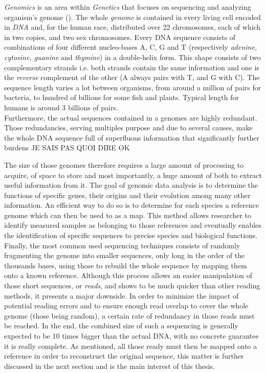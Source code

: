 \textit{Genomics} is an area within \textit{Genetics} that focuses on sequencing and analyzing organism's genome (\cite{genomic}). The whole \textit{genome} is contained in every living cell  encoded in \textit{DNA} and, for the human race, distributed over 22 chromosomes, each of which in two copies, and two sex chromosomes. Every DNA sequence consists of combinations of four different nucleo-bases A, C, G and T (respectively \textit{adenine, cytosine, guanine} and \textit{thymine}) in a double-helix form. This shape consists of two complementary strands i.e. both strands contain the same information and one is the \textit{reverse} complement of the other (A always pairs with T, and G with C). The sequence length varies a lot between organisms, from around a million of pairs for bacteria, to hundred of billions for some fish and plants. Typical length for humans is around 3 billions of pairs. \\

Furthermore, the actual sequences contained in a genomes are highly redundant. Those redundancies, serving multiples purpose and due to several causes, make the whole DNA sequence full of superfluous information that significantly further burdens
JE SAIS PAS QUOI DIRE OK

The size of those genomes therefore requires a large amount of processing to acquire, of space to store and most importantly, a huge amount of both to extract useful information from it. The goal of genomic data analysis is to determine the functions of specific genes, their origins and their evolution among many other information. An efficient way to do so is to determine for each species a reference genome which can then be used to as a map. This method allows researcher to identify measured samples as belonging to those references and eventually enables the identification of specific sequences to precise species and biological functions. \\

Finally, the most common used sequencing techniques consists of randomly fragmenting the genome into smaller sequences, only long in the order of the thousands bases, using those to rebuild the whole sequence by mapping them onto a known reference. Although this process allows an easier manipulation of those short sequences, or \textit{reads}, and shows to be much quicker than other reading methods, it presents a major downside. In order to minimize the impact of potential reading errors and to ensure enough read overlap to cover the whole genome (those being random), a certain rate of redundancy in those reads must be reached. In the end, the combined size of such a sequencing is generally expected to be 10 times bigger than the actual DNA, with no concrete guarantee it is really complete. As mentioned, all those ready must then be mapped onto a reference in order to reconstruct the original sequence, this matter is further discussed in the next section and is the main interest of this thesis. 

